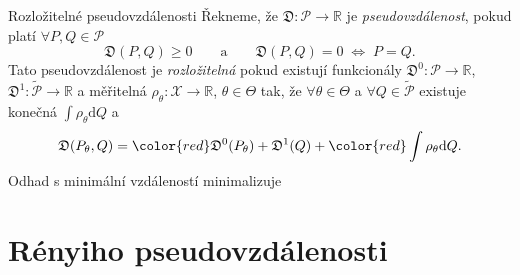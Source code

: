 \documentclass[11pt,a4paper]{beamer}
\begin{document}
\begin{frame}{Rozložitelné pseudovzdálenosti}
		Řekneme, že $\mathfrak{D}:\mathcal{P} \rightarrow \mathbb{R}$ je \emph{pseudovzdálenost}, pokud platí $\forall P,Q\in\mathcal{P}$
		\begin{equation*}
			\mathfrak{D}(P,Q) \geq 0  \qquad \text{a} \qquad \mathfrak{D}(P,Q)=0 \; \Leftrightarrow \; P=Q.
		\end{equation*}
		 Tato  pseudovzdálenost je  \emph{rozložitelná} pokud existují funkcionály
		 $\mathfrak{D}^0:\mathcal{P}\rightarrow\mathbb{R}$, $ \mathfrak{D}^1:\mathcal{\tilde{P}} \rightarrow \mathbb{R}$ a měřitelná
		  $\rho_\theta : \mathcal{X} \rightarrow \mathbb{R}$, $ \theta \in \Theta$ tak, že $\forall \theta \in \Theta$ a $\forall Q \in \mathcal{\tilde{P}}$ existuje konečná $\int{\rho_\theta }\mathrm{d}Q$ a
		\begin{equation*}
			\mathfrak{D} (P_\theta, Q) ={\color{red} \mathfrak{D}^0 (P_\theta) }+ \mathfrak{D}^1 (Q) + {\color{red}\int \rho_\theta \mathrm{d}Q}.
		\end{equation*}
		Odhad s minimální vzdáleností {\color{red}minimalizuje}
\end{frame}

%		


\section{Rényiho pseudovzdálenosti} %
\end{document}
